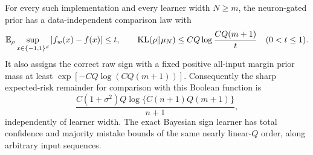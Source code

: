 \begin{theorem}
\label{thm:ard-Boolean-restoration}
For every such implementation and every learner width $N\ge m$, the neuron-gated prior has a data-independent comparison law with
\[
 \mathbb E_\rho\sup_{x\in\{-1,1\}^d}|f_w(x)-f(x)|\le t,
 \qquad
 \operatorname{KL}(\rho\|\mu_N)\le C Q\log\frac{C Q(m+1)}t
 \quad(0<t\le1).
\]
It also assigns the correct raw sign with a fixed positive all-input margin prior mass at least $\exp[-CQ\log(CQ(m+1))]$. Consequently the sharp expected-risk remainder for comparison with this Boolean function is
\[
 \frac{C(1+\sigma^2)Q\log\{C(n+1)Q(m+1)\}}{n+1},
\]
independently of learner width. The exact Bayesian sign learner has total confidence and majority mistake bounds of the same nearly linear-$Q$ order, along arbitrary input sequences.
\end{theorem}
